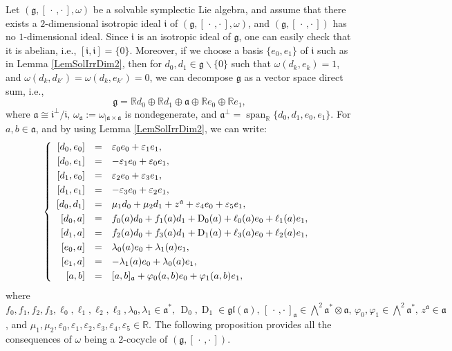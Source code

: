 \documentclass[final,1p,times,nopreprintline]{elsarticle}
\theoremstyle{definition}
\numberwithin{equation}{section}
\newcommand{\rel}{\mathbb{R}}
\newcommand{\w}{\omega}
\newcommand{\g}{\mathfrak{g}}
\newcommand{\ai}{\mathfrak{a}}
\newcommand{\Span}{\operatorname{span}}
\numberwithin{equation}{section}
\newcommand{\ii}{\mathfrak{i}}
\newcommand{\D}{\operatorname{D}}
\newcommand{\gl}{\mathfrak{gl}}
\newcommand{\cro}{[\,\cdot\,,\cdot\,]}
\begin{document}
Let $(\g,[\,\cdot\,,\cdot\,],\w)$ be a solvable symplectic Lie algebra, and assume that there exists a $2$-dimensional isotropic ideal $\mathfrak{i}$ of $(\g,\cro,\w)$, and $(\g,\cro)$ has no $1$-dimensional ideal. Since $\mathfrak{i}$ is an isotropic ideal of $\g$, one can easily check that it is abelian, i.e., $[\ii,\ii]=\{0\}$. Moreover, if we choose a basis $\{e_0,e_1\}$ of $\mathfrak{i}$ such as in Lemma \ref{LemSolIrrDim2}, then for $d_0,d_1\in\g\backslash\{0\}$ such that $\w(d_k,e_k)=1$, and $\w(d_k,d_{k'})=\w(d_k,e_{k'})=0$, we can decompose $\g$ as a vector space direct sum, i.e.,
\begin{equation*}
	\g=\rel d_0\oplus\rel d_1\oplus\ai\oplus\rel e_0\oplus\rel e_1,
\end{equation*}
where $\ai\cong\mathfrak{i}^\perp/\mathfrak{i}$, $\w_\ai:=\w_{|\ai\times\ai}$ is nondegenerate, and $\ai^\perp=\Span_\rel\{d_0,d_1,e_0,e_1\}$. For $a,b\in\ai$, and by using Lemma \ref{LemSolIrrDim2}, we can write:
\begin{equation}\label{eqSolDim2}
	\left\{
	\begin{array}{r c l}\vspace{1mm}
		\left[d_0,e_0\right]&=&\varepsilon_0e_0+\varepsilon_1e_1,\\\vspace{1mm}
		\left[d_0,e_1\right]&=&-\varepsilon_1e_0+\varepsilon_0e_1,\\\vspace{1mm}
		\left[d_1,e_0\right]&=&\varepsilon_2e_0+\varepsilon_3e_1,\\\vspace{1mm}
		\left[d_1,e_1\right]&=&-\varepsilon_3e_0+\varepsilon_2e_1,\\\vspace{1mm}
		\left[d_0,d_1\right]&=&\mu_1d_0+\mu_2d_1+z^\ai+\varepsilon_4e_0+\varepsilon_5e_1,\\\vspace{1mm}
		\left[d_0,a\right]&=&f_0(a)d_0+f_1(a)d_1+\D_0(a)+\ell_0(a)e_0+\ell_1(a)e_1,\\ \vspace{1mm}
		\left[d_1,a\right]&=&f_2(a)d_0+f_3(a)d_1+\D_1(a)+\ell_3(a)e_0+\ell_2(a)e_1,\\\vspace{1mm}
		\left[e_0,a\right]&=&\lambda_0(a)e_0+\lambda_1(a)e_1,\hfill\\\vspace{1mm}
		\left[e_1,a\right]&=&-\lambda_1(a)e_0+\lambda_0(a)e_1,\hfill\\
		\left[a,b\right]&=&[a,b]_\ai+\varphi_0(a,b)e_0+\varphi_1(a,b)e_1,
	\end{array}
	\right.\\
\end{equation}
where $f_0,f_1,f_2,f_3,\ell_0,\ell_1,\ell_2,\ell_3,\lambda_0,\lambda_1\in\ai^*,\,\D_0,\D_1\in\gl(\ai),\,[\,\cdot\,,\cdot\,]_\ai\in\bigwedge^2\ai^*\otimes\ai,\,\varphi_0,\varphi_1\in\bigwedge^2\ai^*,\,z^\ai\in\ai$, and $\mu_1,\mu_2,\varepsilon_0,\varepsilon_1,\varepsilon_2,\varepsilon_3,\varepsilon_4,\varepsilon_5\in\rel$. The following proposition provides all the consequences of $\w$ being a $2$-cocycle of $(\g,\cro)$.
\end{document}
